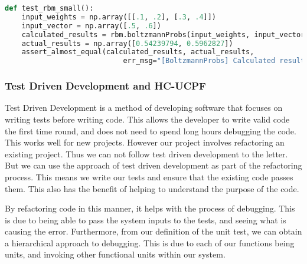 \begin{minipage}{\linewidth}
\begin{lstlisting}[caption=Example test for a unit, label=code:test, language=python]
def test_rbm_small():
    input_weights = np.array([[.1, .2], [.3, .4]])
    input_vector = np.array([.5, .6])
    calculated_results = rbm.boltzmannProbs(input_weights, input_vector)
    actual_results = np.array([0.54239794, 0.5962827])
    assert_almost_equal(calculated_results, actual_results,
                            err_msg="[BoltzmannProbs] Calculated results are not equal to actual results to 7 decimal places.")
\end{lstlisting}
\end{minipage}

{
 
 }      


\subsubsection{Test Driven Development and HC-UCPF}
Test Driven Development is a method of developing software that focuses on writing tests before writing code.
This allows the developer to write valid code the first time round, and does not need to spend long hours debugging the code.
This works well for new projects.
However our project involves refactoring an existing project.
Thus we can not follow test driven development to the letter.
But we can use the approach of test driven development as part of the refactoring process.
This means we write our tests and ensure that the existing code passes them.
This also has the benefit of helping to understand the purpose of the code.

By refactoring code in this manner, it helps with the process of debugging.
This is due to being able to pass the system inputs to the tests, and seeing what is causing the error.
Furthermore, from our definition of the unit test, we can obtain a hierarchical approach to debugging.
This is due to each of our functions being units, and invoking other functional units within our system.

